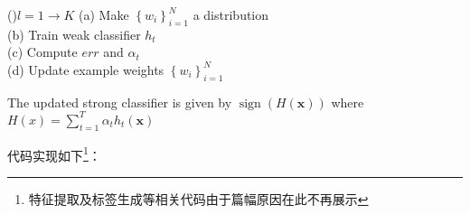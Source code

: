 \begin{algorithm}
{         \For(){$l=1 \to K$}
         {
         (a) Make $\left\{w_i\right\}_{i=1}^N$ a distribution\\
         (b) Train weak classifier $h_t$\\
         (c) Compute $e r r$ and $\alpha_t$\\
         (d) Update example weights $\left\{w_i\right\}_{i=1}^N$
         }
         
         The updated strong classifier is given by $\operatorname{sign}(H(\mathbf{x}))$ where $H(x)=\sum_{t=1}^T \alpha_t h_t(\mathbf{x})$
         }
    \end{algorithm}



代码实现如下\footnote{特征提取及标签生成等相关代码由于篇幅原因在此不再展示}：

\vspace{0.3cm}

